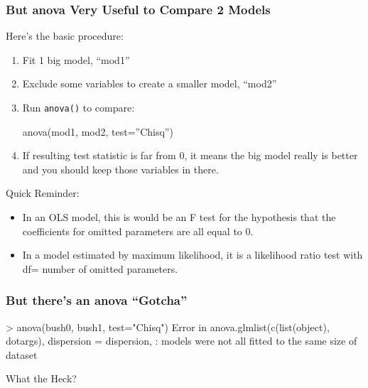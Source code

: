 \documentclass[10pt,english]{beamer}
\begin{document}
\begin{frame}
  \frametitle{But anova Very Useful to Compare 2 Models}

  Here's the basic procedure:

  \begin{enumerate}
  \item Fit 1 big model, ``mod1''
  \item Exclude some variables to create a smaller model, ``mod2''
  \item Run \texttt{anova()} to compare:

      anova(mod1, mod2, test=''Chisq'')

   \item If resulting test statistic is far from 0, it means the big
     model really is better and you should keep those variables in there.
   \end{enumerate}

   Quick Reminder:

   \begin{itemize}
   \item In an OLS model, this is would be an F test for the
     hypothesis that the coefficients for omitted parameters are all
     equal to 0.
   \item In a model estimated by maximum likelihood, it is a
     likelihood ratio test with df= number of omitted parameters.
   \end{itemize}
 \end{frame}



\begin{frame}
  \frametitle{But there's an anova ``Gotcha''}


\begin{Schunk}
  \begin{Soutput}
> anova(bush0, bush1, test="Chisq")
Error in anova.glmlist(c(list(object), dotargs),
  dispersion = dispersion,  :
  models were not all fitted to the same size of dataset
\end{Soutput}
\end{Schunk}

  What the Heck?
\end{frame}

\end{document}
